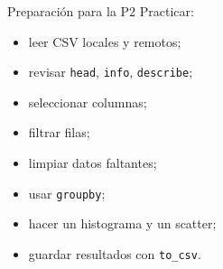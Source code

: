 \documentclass[10pt]{beamer}
\begin{document}
\begin{frame}{Preparación para la P2}
  Practicar:
  \begin{itemize}
    \item leer CSV locales y remotos;
    \item revisar \texttt{head}, \texttt{info}, \texttt{describe};
    \item seleccionar columnas;
    \item filtrar filas;
    \item limpiar datos faltantes;
    \item usar \texttt{groupby};
    \item hacer un histograma y un scatter;
    \item guardar resultados con \texttt{to\_csv}.
  \end{itemize}
\end{frame}
\end{document}
